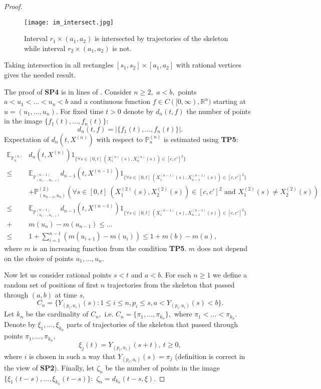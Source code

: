 \documentclass[a4paper,12pt]{article}
\newcommand{\1}{1\!\!\,{\rm I}}
\theoremstyle{plain}
\begin{document}
\begin{proof}
	\begin{figure}[!h]
		\centering
		\caption{Interval $r_1\times(a_1,a_2)$ is intersected by trajectories of the skeleton while interval $r_2\times(a_1,a_2)$ is not.}
		\texttt{[image: im\_intersect.jpg]}
	\end{figure} 
	
	Taking intersection in all rectangles $[s_1,s_2]\times[a_1,a_2]$ with rational vertices gives the needed result.
	
	The proof of {\bf SP4} is in lines of \cite{D2, Matsumoto}. Consider $n\geq 2,$ $a<b,$ points $a<u_1<\ldots<u_n<b$ and a continuous function $f \in C([0,\infty),\mathbb{R}^n)$ starting at $u=(u_1,\ldots,u_n).$ For  fixed time $t>0$ denote by $d_n(t,f)$ the number of points in the image $\{f_1(t),\ldots,f_n(t)\}:$ 
	$$
	d_n(t,f)=|\{f_1(t),\ldots,f_n(t)\}|.
	$$
	Expectation of $d_n(t,X^{(n)})$ with respect to $\mathbb{P}^{(n)}_{u}$ is estimated using {\bf TP5}:
	$$
	\begin{aligned}
	\mathbb{E}_{\mathbb{P}^{(n)}_{u}}& d_n(t,X^{(n)})1_{\{\forall s\in[0,t] \ (X^{(n)}_1(s),X^{(n)}_n(s))\in [c,c']^2\}} \\
	\leq & \mathbb{E}_{\mathbb{P}^{(n-1)}_{(u_1,\ldots,u_{n-1})}}d_{n-1}(t,X^{(n-1)})1_{\{\forall s\in[0,t] \ (X^{(n-1)}_1(s),X^{(n-1)}_{n-1}(s))\in [c,c']^2\}} \\
	&	+\mathbb{P}^{(2)}_{(u_{n-1},u_n)}(\forall s\in[0,t] \ (X^{(2)}_1(s),X^{(2)}_2(s))\in[c,c']^2 \mbox{ and } X^{(2)}_1(s)\ne X^{(2)}_2(s))\\
	\leq & \mathbb{E}_{\mathbb{P}^{(n-1)}_{(u_1,\ldots,u_{n-1})}}d_{n-1}(t,X^{(n-1)})1_{\{\forall s\in[0,t] \ (X^{(n-1)}_1(s),X^{(n-1)}_{n-1}(s))\in [c,c']^2\}}\\
	+& m(u_n)-m(u_{n-1})	\leq  \ldots \\
	\leq & 1+ \sum^{n-1}_{i=1}(m(u_{i+1})-m(u_i))\leq 1+m(b)-m(a),
	\end{aligned}
	$$
	where $m$ is an increasing function from the condition {\bf TP5}. $m$ does not depend on the choice of points $u_1,\ldots,u_n.$ 
	
	Now let us consider rational points $s<t$ and $a<b.$ For each $n\geq 1$ we define a random set of positions of first $n$ trajectories from the skeleton that passed through  $(a,b)$ at time $s,$
	$$
	C_n=\{Y_{(p_i,u_i)}(s):1\leq i\leq n, p_i\leq s, a<Y_{(p_i,u_i)}(s)<b\}.
	$$
	Let $k_n$ be the cardinality of $C_n,$ i.e. $	C_n=\{\pi_1,\ldots,\pi_{k_n}\}, $ 	where $\pi_1<\ldots<\pi_{k_n}.$ Denote by $\xi_1,\ldots,\xi_{k_n}$ parts of trajectories of the skeleton that passed through points $\pi_1,\ldots,\pi_{k_n},$ 
	$$
	\xi_{j}(t)=Y_{(p_i,u_i)}(s+t), \ t\geq 0,
	$$
	where $i$ is chosen in such a way that $Y_{(p_i,u_i)}(s)=\pi_j$ (definition is correct in the view of {\bf SP2}). Finally, let $\zeta_n$ be the number of points in the image $\{\xi_1(t-s),\ldots,\xi_{k_n}(t-s)\}:$ $	\zeta_n=d_{k_n}(t-s,\xi).$
	

\end{proof}
\end{document}
